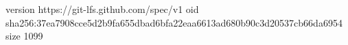 version https://git-lfs.github.com/spec/v1
oid sha256:37ea7908cce5d2b9fa655dbad6bfa22eaa6613ad680b90c3d20537cb66da6954
size 1099
